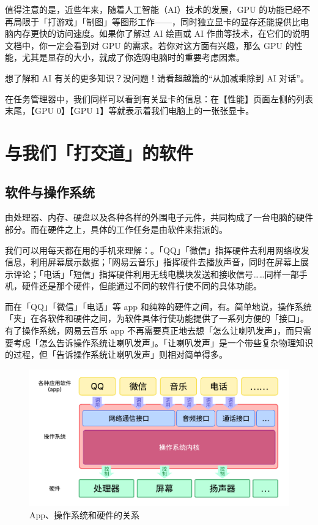 值得注意的是，近些年来，随着人工智能（AI）技术的发展，GPU 的功能已经不再局限于「打游戏」「制图」等图形工作——，同时独立显卡的显存还能提供比电脑内存更快的访问速度。如果你了解过 AI 绘画或 AI 作曲等技术，在它们的说明文档中，你一定会看到对 GPU 的需求。若你对这方面有兴趣，那么 GPU 的性能，尤其是显存的大小，就成了你选购电脑时的重要考虑因素。

\begin{note}
  想了解和 AI 有关的更多知识？没问题！请看超越篇的“从加减乘除到 AI 对话”。
\end{note}

在任务管理器中，我们同样可以看到有关显卡的信息：在【性能】页面左侧的列表末尾，【GPU 0】【GPU 1】等就表示着我们电脑上的一张张显卡。

\section{与我们「打交道」的软件}

\subsection{软件与操作系统}

由处理器、内存、硬盘以及各种各样的外围电子元件，共同构成了一台电脑的硬件部分。而在硬件之上，具体的工作任务是由软件来指派的。

我们可以用每天都在用的手机来理解：。「QQ」「微信」指挥硬件去利用网络收发信息，利用屏幕展示数据；「网易云音乐」指挥硬件去播放声音，同时在屏幕上展示评论；「电话」「短信」指挥硬件利用无线电模块发送和接收信号……同样一部手机，硬件还是那个硬件，但能通过不同的软件行使不同的具体功能。

而在「QQ」「微信」「电话」等 app 和纯粹的硬件之间，有。简单地说，操作系统「夹」在各软件和硬件之间，为软件具体行使功能提供了一系列方便的「接口」。有了操作系统，网易云音乐 app 不再需要真正地去想「怎么让喇叭发声」，而只需要考虑「怎么告诉操作系统让喇叭发声」。「让喇叭发声」是一个带些复杂物理知识的过程，但「告诉操作系统让喇叭发声」则相对简单得多。

\begin{figure}[htb!]
  \centering
  \includegraphics[width=.8\textwidth]{assets/basic/OS_structure.pdf}
  \caption{App、操作系统和硬件的关系}
  \label{fig:OS_structure}
\end{figure}

